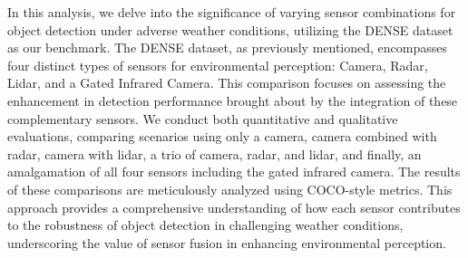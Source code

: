 \documentclass[report.tex]{subfiles}
\begin{document}
    In this analysis, we delve into the significance of varying sensor combinations for object detection under adverse weather conditions, utilizing the DENSE dataset as our benchmark. The DENSE dataset, as previously mentioned, encompasses four distinct types of sensors for environmental perception: Camera, Radar, Lidar, and a Gated Infrared Camera. This comparison focuses on assessing the enhancement in detection performance brought about by the integration of these complementary sensors. We conduct both quantitative and qualitative evaluations, comparing scenarios using only a camera, camera combined with radar, camera with lidar, a trio of camera, radar, and lidar, and finally, an amalgamation of all four sensors including the gated infrared camera. The results of these comparisons are meticulously analyzed using COCO-style metrics. This approach provides a comprehensive understanding of how each sensor contributes to the robustness of object detection in challenging weather conditions, underscoring the value of sensor fusion in enhancing environmental perception.
    
\end{document}
